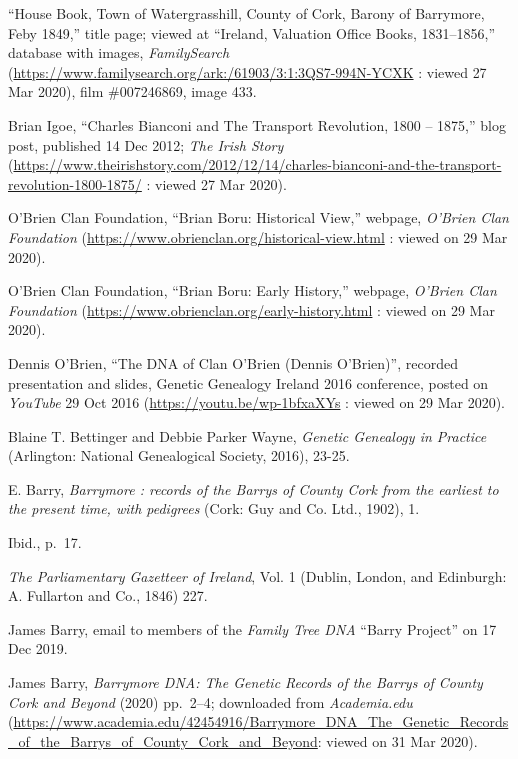 \begin{thebibliography}{999}
	``House Book, Town of Watergrasshill, County of Cork, Barony of Barrymore, Feby 1849,'' title page; viewed at ``Ireland, Valuation Office Books, 1831--1856,'' database with images, \textit{FamilySearch} (\url{https://www.familysearch.org/ark:/61903/3:1:3QS7-994N-YCXK} : viewed 27 Mar 2020), film \#007246869, image 433.
	
	Brian Igoe, ``Charles Bianconi and The Transport Revolution, 1800 -- 1875,'' blog post, published 14 Dec 2012; \textit{The Irish Story} (\url{https://www.theirishstory.com/2012/12/14/charles-bianconi-and-the-transport-revolution-1800-1875/} : viewed 27 Mar 2020).
	
	O'Brien Clan Foundation, ``Brian Boru: Historical View,'' webpage, \textit{O'Brien Clan Foundation} (\url{https://www.obrienclan.org/historical-view.html} : viewed on 29 Mar 2020).
	
	O'Brien Clan Foundation, ``Brian Boru: Early History,'' webpage, \textit{O'Brien Clan Foundation} (\url{https://www.obrienclan.org/early-history.html} : viewed on 29 Mar 2020).	
	
	Dennis O'Brien, ``The DNA of Clan O'Brien (Dennis O'Brien)'', recorded presentation and slides, Genetic Genealogy Ireland 2016 conference, posted on \textit{YouTube} 29 Oct 2016 (\url{https://youtu.be/wp-1bfxaXYs} : viewed on 29 Mar 2020).
	
	Blaine T. Bettinger and Debbie Parker Wayne, \textit{Genetic Genealogy in Practice} (Arlington: National Genealogical Society, 2016), 23-25.
	
	E. Barry, \textit{Barrymore : records of the Barrys of County Cork from the earliest to the present time, with pedigrees} (Cork: Guy and Co. Ltd., 1902), 1.
	
	Ibid., p.\ 17.
	
	\textit{The Parliamentary Gazetteer of Ireland}, Vol. 1 (Dublin, London, and Edinburgh: A. Fullarton and Co., 1846) 227.
	
	James Barry, email to members of the \textit{Family Tree DNA} ``Barry Project'' on 17 Dec 2019.
	
	James Barry, \textit{Barrymore DNA: The Genetic Records of the Barrys of County Cork and Beyond} (2020) pp.\ 2--4; downloaded from \textit{Academia.edu} (\url{https://www.academia.edu/42454916/Barrymore_DNA_The_Genetic_Records_of_the_Barrys_of_County_Cork_and_Beyond}: viewed on 31 Mar 2020).
	

\end{thebibliography}
